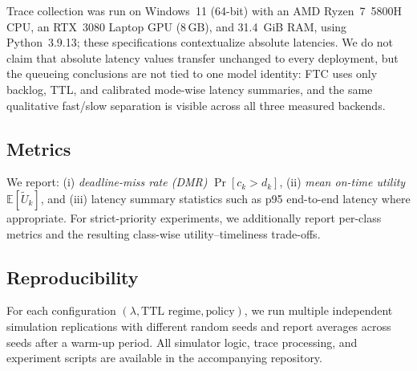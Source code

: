 \documentclass[fleqn,12pt,lineno]{wlpeerj}
\begin{document}
Trace collection was run on Windows~11 (64-bit) with an AMD Ryzen~7~5800H CPU, an RTX~3080 Laptop GPU (8\,GB), and 31.4~GiB RAM, using Python~3.9.13; these specifications contextualize absolute latencies. We do not claim that absolute latency values transfer unchanged to every deployment, but the queueing conclusions are not tied to one model identity: FTC uses only backlog, TTL, and calibrated mode-wise latency summaries, and the same qualitative fast/slow separation is visible across all three measured backends.

\subsection{Metrics}
\label{sec:metrics}

We report:
(i) \emph{deadline-miss rate (DMR)} $\Pr[c_k>d_k]$,
(ii) \emph{mean on-time utility} $\mathbb{E}[\tilde{U}_k]$,
and (iii) latency summary statistics such as p95 end-to-end latency where appropriate.
For strict-priority experiments, we additionally report per-class metrics and the resulting class-wise utility--timeliness trade-offs.

\subsection{Reproducibility}
\label{sec:repro}

For each configuration $(\lambda,\text{TTL regime},\text{policy})$, we run multiple independent simulation replications with different random seeds and report averages across seeds after a warm-up period. All simulator logic, trace processing, and experiment scripts are available in the accompanying repository.
\end{document}
